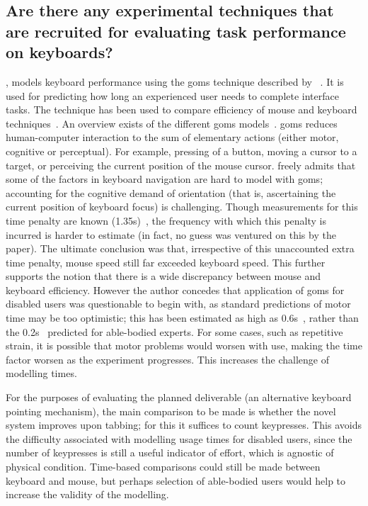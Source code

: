 \documentclass[a4paper, 11pt]{article}
\begin{document}
\subsection{Are there any experimental techniques that are recruited for evaluating task performance on keyboards?}
\citeauthor{schrepp2006efficiency}, \citeyear{schrepp2006efficiency} models keyboard performance using the \gls{goms} technique described by \citeauthor{card1983psychology}~\cite{card1983psychology}. It is used for predicting how long an experienced user needs to complete interface tasks. The technique has been used to compare efficiency of mouse and keyboard techniques~\cite{card1983psychology,john1996goms}. An overview exists of the different \gls{goms} models~\cite{john1995goms}. \gls{goms} reduces human-computer interaction to the sum of elementary actions (either motor, cognitive or perceptual). For example, pressing of a button, moving a cursor to a target, or perceiving the current position of the mouse cursor. \citeauthor{schrepp2006efficiency} freely admits that some of the factors in keyboard navigation are hard to model with \gls{goms}; accounting for the cognitive demand of orientation (that is, ascertaining the current position of keyboard focus) is challenging. Though measurements for this time penalty are known (1.35s)~\cite{raskin2000humane}, the frequency with which this penalty is incurred is harder to estimate (in fact, no guess was ventured on this by the paper). The ultimate conclusion was that, irrespective of this unaccounted extra time penalty, mouse speed still far exceeded keyboard speed. This further supports the notion that there is a wide discrepancy between mouse and keyboard efficiency. However the author concedes that application of \gls{goms} for disabled users was questionable to begin with, as standard predictions of motor time may be too optimistic; this has been estimated as high as 0.6s~\cite{keates1998developing}, rather than the 0.2s~\cite{raskin2000humane} predicted for able-bodied experts. For some cases, such as repetitive strain, it is possible that motor problems would worsen with use, making the time factor worsen as the experiment progresses. This increases the challenge of modelling times.

For the purposes of evaluating the planned deliverable (an alternative keyboard pointing mechanism), the main comparison to be made is whether the novel system improves upon tabbing; for this it suffices to count keypresses. This avoids the difficulty associated with modelling usage times for disabled users, since the number of keypresses is still a useful indicator of effort, which is agnostic of physical condition. Time-based comparisons could still be made between keyboard and mouse, but perhaps selection of able-bodied users would help to increase the validity of the modelling.
\end{document}
